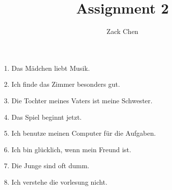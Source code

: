 \documentclass{article}
\title{Assignment 2}
\author{Zack Chen}
\begin{document}
\maketitle

\begin{enumerate}
    \item Das M\"adchen liebt Musik.
    \item Ich finde das Zimmer besonders gut.
    \item Die Tochter meines Vaters ist meine Schwester.
    \item Das Spiel beginnt jetzt.
    \item Ich benutze meinen Computer f\"ur die Aufgaben.
    \item Ich bin gl\"ucklich, wenn mein Freund ist.
    \item Die Junge sind oft dumm.
    \item Ich verstehe die vorlesung nicht.
\end{enumerate}

% 
% 
\end{document}
